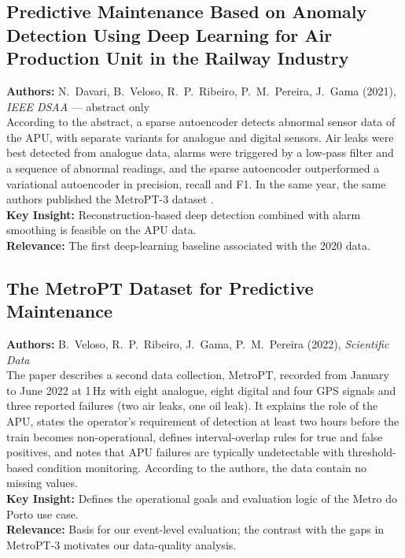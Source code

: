 \subsection[Davari et al. (2021): Deep Anomaly Detection for the APU]{Predictive Maintenance Based on Anomaly Detection Using Deep Learning for Air Production Unit in the Railway Industry}
\textbf{Authors:} N.~Davari, B.~Veloso, R.~P.~Ribeiro, P.~M.~Pereira, J.~Gama (2021), \textit{IEEE DSAA} \cite{davari2021dsaa} --- abstract only\\
According to the abstract, a sparse autoencoder detects abnormal sensor data of the APU, with separate variants for analogue and digital sensors. Air leaks were best detected from analogue data, alarms were triggered by a low-pass filter and a sequence of abnormal readings, and the sparse autoencoder outperformed a variational autoencoder in precision, recall and F1. In the same year, the same authors published the MetroPT-3 dataset \cite{davari2021metropt3data}.\\
\textbf{Key Insight:} Reconstruction-based deep detection combined with alarm smoothing is feasible on the APU data.\\
\textbf{Relevance:} The first deep-learning baseline associated with the 2020 data.

\subsection[Veloso et al. (2022): The MetroPT Dataset]{The MetroPT Dataset for Predictive Maintenance}
\textbf{Authors:} B.~Veloso, R.~P.~Ribeiro, J.~Gama, P.~M.~Pereira (2022), \textit{Scientific Data} \cite{veloso2022metropt}\\
The paper describes a second data collection, MetroPT, recorded from January to June 2022 at 1\,Hz with eight analogue, eight digital and four GPS signals and three reported failures (two air leaks, one oil leak). It explains the role of the APU, states the operator's requirement of detection at least two hours before the train becomes non-operational, defines interval-overlap rules for true and false positives, and notes that APU failures are typically undetectable with threshold-based condition monitoring. According to the authors, the data contain no missing values.\\
\textbf{Key Insight:} Defines the operational goals and evaluation logic of the Metro do Porto use case.\\
\textbf{Relevance:} Basis for our event-level evaluation; the contrast with the gaps in MetroPT-3 motivates our data-quality analysis.


